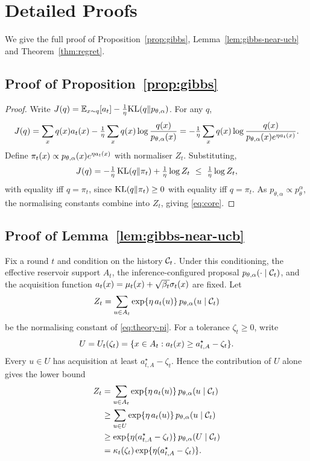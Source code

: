 \section{Detailed Proofs}
\label{sec:theory}

We give the full proof of Proposition~\ref{prop:gibbs}, Lemma~\ref{lem:gibbs-near-ucb} and Theorem~\ref{thm:regret}.
\subsection{Proof of Proposition~\ref{prop:gibbs}}
\label{prop_proof}
\begin{proof}
Write $J(q)=\mathbb{E}_{x\sim q}[a_t]-\tfrac1\eta\mathrm{KL}(q\|p_{\theta,\alpha})$. For any $q$,
\[
J(q)=\sum_x q(x)a_t(x)-\tfrac1\eta\sum_x q(x)\log\frac{q(x)}{p_{\theta,\alpha}(x)}
=-\tfrac1\eta\sum_x q(x)\log\frac{q(x)}{p_{\theta,\alpha}(x)e^{\eta a_t(x)}}.
\]
Define $\pi_t(x)\propto p_{\theta,\alpha}(x)e^{\eta a_t(x)}$ with normaliser $Z_t$. Substituting,
\[
J(q)=-\tfrac1\eta\,\mathrm{KL}(q\|\pi_t)+\tfrac1\eta\log Z_t\ \le\ \tfrac1\eta\log Z_t,
\]
with equality iff $q=\pi_t$, since $\mathrm{KL}(q\|\pi_t)\ge 0$ with equality iff $q=\pi_t$. As
$p_{\theta,\alpha}\propto p_\theta^{\alpha}$, the normalising constants combine into $Z_t$, giving
\eqref{eq:core}.
\end{proof}

\subsection{Proof of Lemma~\ref{lem:gibbs-near-ucb}}
\label{app:gibbs-lemma}

Fix a round $t$ and condition on the history $\mathcal{C}_t$. Under this conditioning, the effective
reservoir support $A_t$, the inference-configured proposal $p_{\theta,\alpha}(\cdot\mid\mathcal{C}_t)$, and
the acquisition function $a_t(x)=\mu_t(x)+\sqrt{\beta_t}\sigma_t(x)$ are fixed. Let
\[
Z_t=\sum_{u\in A_t}\exp\{\eta\,a_t(u)\}\,p_{\theta,\alpha}(u\mid\mathcal{C}_t)
\]
be the normalising constant of \eqref{eq:theory-pi}. For a tolerance $\zeta_t\ge0$, write
\[
U=U_t(\zeta_t)
=
\{x\in A_t:a_t(x)\ge a_{t,A}^\star-\zeta_t\}.
\]
Every $u\in U$ has acquisition at least $a_{t,A}^\star-\zeta_t$. Hence the contribution of $U$ alone gives the
lower bound
\begin{align}
Z_t
&=
\sum_{u\in A_t}\exp\{\eta\,a_t(u)\}\,p_{\theta,\alpha}(u\mid\mathcal{C}_t) \notag\\
&\ge
\sum_{u\in U}\exp\{\eta\,a_t(u)\}\,p_{\theta,\alpha}(u\mid\mathcal{C}_t) \notag\\
&\ge
\exp\{\eta(a_{t,A}^\star-\zeta_t)\}\,p_{\theta,\alpha}(U\mid\mathcal{C}_t) \notag\\
&=
\kappa_t(\zeta_t)\exp\{\eta(a_{t,A}^\star-\zeta_t)\}.
\label{eq:zt-lower}
\end{align}

